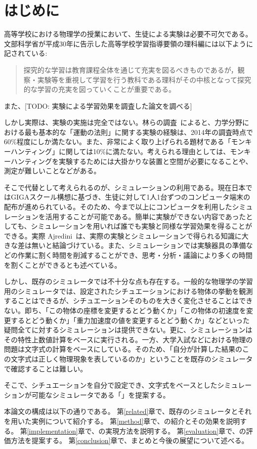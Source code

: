 \chapter{はじめに} \label{first}

高等学校における物理学の授業において、生徒による実験は必要不可欠である。文部科学省が平成30年に告示した高等学校学習指導要領の理科編には以下ように記されている:
\begin{quote}
探究的な学習は教育課程全体を通じて充実を図るべきものであるが，観察・実験等を重視して学習を行う教科である理科がその中核となって探究的な学習の充実を図っていくことが重要である。
\end{quote}
また、[TODO: 実験による学習効果を調査した論文を調べる]

しかし実際は、実験の実施は完全ではない。林らの調査~\cite{2015KJ00010038066}によると、力学分野における最も基本的な「運動の法則」に関する実験の経験は、2014年の調査時点で60\%程度にしか満たない。また、非常によく取り上げられる題材である「モンキーハンティング」に関しては10\%に満たない。考えられる理由としては、モンキーハンティングを実験するためには大掛かりな装置と空間が必要になることや、測定が難しいことなどがある。

そこで代替として考えられるのが、シミュレーションの利用である。現在日本ではGIGAスクール構想に基づき、生徒に対して1人1台ずつのコンピュータ端末の配布が進められている。そのため、今まで以上にコンピュータを利用したシミュレーションを活用することが可能である。簡単に実験ができない内容であったとしても、シミュレーションを用いれば誰でも実験と同様な学習効果を得ることができる。実際 Ajredini~\cite{ajredini_real_2014}は、実際の実験とシミュレーションで得られる知識に大きな差は無いと結論づけている。また、シミュレーションでは実験器具の準備などの作業に割く時間を削減することができ、思考・分析・議論により多くの時間を割くことができるとも述べている。

しかし、既存のシミュレータでは不十分な点も存在する。一般的な物理学の学習用のシミュレータでは、設定されたシチュエーションにおける物体の挙動を観測することはできるが、シチュエーションそのものを大きく変化させることはできない。即ち、「この物体の座標を変更するとどう動くか」「この物体の初速度を変更するとどう動くか」「重力加速度の値を変更するとどう動くか」などといった疑問全てに対するシミュレーションは提供できない。更に、シミュレーションはその特性上数値計算をベースに実行される。一方、大学入試などにおける物理の問題は文字式の計算をベースにしている。そのため、「自分が計算した結果のこの文字式は正しく物理現象を表しているのか」ということを既存のシミュレータで確認することは難しい。

そこで、シチュエーションを自分で設定でき、文字式をベースとしたシミュレーションが可能なシミュレータである「\simname」を提案する。

本論文の構成は以下の通りである。
第\ref{related}章で、既存のシミュレータとそれを用いた実例について紹介する。
第\ref{method}章で、\simname の紹介とその効果を説明する。
第\ref{implementation}章で、\simname の実現方法を説明する。
第\ref{evaluation}章で、\simname の評価方法を提案する。
第\ref{conclusion}章で、まとめと今後の展望について述べる。
